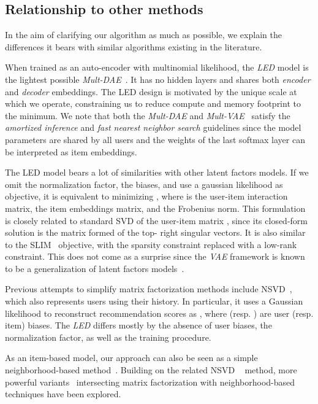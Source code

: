\documentclass[sigconf]{acmart}
\begin{document}
\subsection{Relationship to other methods} 
In the aim of clarifying our algorithm as much as possible, we explain the differences it bears with similar algorithms existing in the literature.

When trained as an auto-encoder with multinomial likelihood, the \emph{LED} model is the lightest possible \emph{Mult-DAE}~\cite{variational-liang-2018}. It has no hidden layers and shares both \emph{encoder} and \emph{decoder} embeddings. The LED design is motivated by the unique scale at which we operate, constraining us to reduce compute and memory footprint to the minimum. We note that both the \emph{Mult-DAE} and \emph{Mult-VAE}~\cite{variational-liang-2018} satisfy the \emph{amortized inference} and \emph{fast nearest neighbor search} guidelines since the model parameters are shared by all users and the weights of the last softmax layer can be interpreted as item embeddings.

The LED model bears a lot of similarities with other latent factors models. If we omit the normalization factor, the biases, and use a gaussian likelihood as objective, it is equivalent to minimizing , where  is the user-item interaction matrix,  the item embeddings matrix, and  the Frobenius norm. This formulation is closely related to standard SVD of the user-item matrix , since its closed-form solution is the matrix formed of the top- right singular vectors. It is also similar to the SLIM~\cite{slim} objective, with the sparsity constraint replaced with a low-rank constraint. This does not come as a surprise since the \emph{VAE} framework is known to be a generalization of latent factors models~\cite{variational-liang-2018}.

Previous attempts to simplify matrix factorization methods include NSVD~\cite{paterek}, which also represents users using their history. In particular, it uses a Gaussian likelihood to reconstruct recommendation scores as , where  (resp. ) are user (resp. item) biases. The \emph{LED} differs mostly by the absence of user biases, the normalization factor, as well as the training procedure.

As an item-based model, our approach can also be seen as a simple neighborhood-based method~\cite{neighbors}. Building on the related NSVD ~\cite{paterek} method, more powerful variants~\cite{koren} intersecting matrix factorization with neighborhood-based techniques have been explored.
\end{document}
